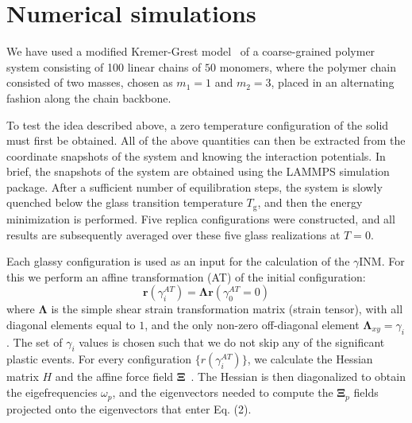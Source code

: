 \documentclass[pre,twocolumn,aps,superscriptaddress,showpacs]{revtex4-1}
\DeclareRobustCommand{\vect}[1]{\bm{#1}}
{%
\newcommand{\addbibsub}{}
}
\begin{document}
\section{Numerical simulations}
We have used a modified Kremer-Grest model~\cite{Kremer1986} of a coarse-grained polymer system consisting of 100 linear chains of $50$ monomers, where the polymer chain consisted of two masses, chosen as $m_1=1$ and $m_2=3$, placed in an alternating fashion along the chain backbone. 

To test the idea described above, a zero temperature configuration of the solid must first be obtained. All of the above quantities can then be extracted from the coordinate snapshots of the system and knowing the interaction potentials. In brief, the snapshots of the system are obtained using the LAMMPS simulation package\cite{LAMMPS}. After a sufficient number of equilibration steps, the system is slowly quenched below the glass transition temperature $T_\text{g}$, and then the energy minimization is performed. Five replica configurations were constructed, and all results are subsequently averaged over these five glass realizations at $T=0$. %

Each glassy configuration is used as an input for the calculation of the $\gamma$INM. For this we perform an affine transformation (AT) of the initial configuration:
\begin{equation}
\vect{r}(\gamma^{AT}_i)=\vect{\Lambda}\vect{r}(\gamma^{AT}_0=0)
\end{equation}
where $\vect{\Lambda}$ is the simple shear strain transformation matrix (strain tensor), with all diagonal elements equal to $1$, and the only non-zero off-diagonal element  $\vect{\Lambda}_{xy}=\gamma_i$. %
The set of ${\gamma_i}$ values is chosen such that we do not skip any of the significant plastic events. 
For every configuration $\{r(\gamma^{AT}_i)\}$, we calculate the  Hessian matrix $H$ and the affine force field $\mathbf{\Xi}$~\cite{Lemaitre2006}. The Hessian is then diagonalized to obtain the eigefrequencies $\omega_p$, and the eigenvectors needed to compute the $\mathbf{\Xi}_p$ fields projected onto the eigenvectors that enter Eq. (2).
\end{document}
